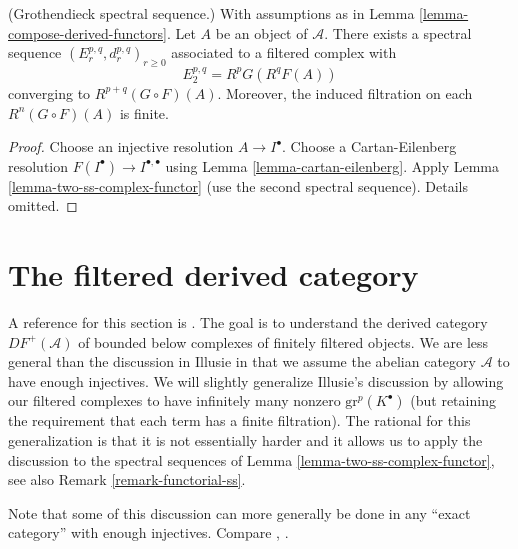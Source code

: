\begin{lemma}
\label{lemma-grothendieck-spectral-sequence}
(Grothendieck spectral sequence.)
With assumptions as in Lemma \ref{lemma-compose-derived-functors}.
Let $A$ be an object of $\mathcal{A}$.
There exists a spectral sequence $(E_r^{p, q}, d_r^{p, q})_{r \geq 0}$
associated to a filtered complex with
$$
E_2^{p, q} = R^pG(R^qF(A))
$$
converging to $R^{p + q}(G \circ F)(A)$. Moreover, the induced filtration
on each $R^n(G \circ F)(A)$ is finite.
\end{lemma}

\begin{proof}
Choose an injective resolution $A \to I^\bullet$.
Choose a Cartan-Eilenberg resolution
$F(I^\bullet) \to I^{\bullet, \bullet}$
using Lemma \ref{lemma-cartan-eilenberg}.
Apply Lemma \ref{lemma-two-ss-complex-functor}
(use the second spectral sequence).
Details omitted.
\end{proof}











\section{The filtered derived category}
\label{section-filtered-derived}

\noindent
A reference for this section is \cite[I, Chapter V]{cotangent}.
The goal is to understand the derived category $DF^{+}(\mathcal{A})$
of bounded below complexes of finitely filtered objects.
We are less general than the discussion in Illusie in that we
assume the abelian category $\mathcal{A}$ to have enough injectives.
We will slightly generalize Illusie's discussion by allowing our
filtered complexes to have infinitely many nonzero $\text{gr}^p(K^\bullet)$
(but retaining the requirement that each term has a finite filtration).
The rational for this generalization is that it is not essentially
harder and it allows us to apply the discussion to the spectral sequences of
Lemma \ref{lemma-two-ss-complex-functor}, see also
Remark \ref{remark-functorial-ss}.

\medskip\noindent
Note that some of this discussion can more generally be done in any
``exact category'' with enough injectives. Compare \cite{Buhler}, \cite{Keller}.


